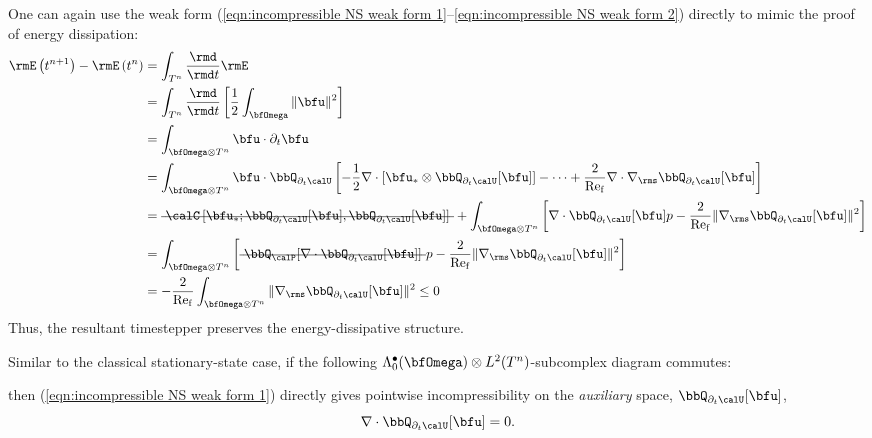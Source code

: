    One can again use the weak form (\ref{eqn:incompressible NS weak form 1}--\ref{eqn:incompressible NS weak form 2}) directly to mimic the proof of energy dissipation:
    \begin{align}
        \rmE\left(t^{n + 1}\right) - \rmE\left(t^{n}\right)
        &=  \int_{T^{n}}\frac{\rmd}{\rmd t}\rmE  \\
        &=  \int_{T^{n}}\frac{\rmd}{\rmd t}\left[\frac{1}{2}\int_{\bfOmega}\|\bfu\|^{2}\right]  \\
        &=  \int_{\bfOmega\otimes T^{n}}\bfu\cdot\partial_{t}\bfu  \\
        &=  \int_{\bfOmega\otimes T^{n}}\bfu\cdot\bbQ_{\partial_{t}\calU}\left[- \frac{1}{2}\nabla\cdot\left[\bfu_{*}\otimes\bbQ_{\partial_{t}\calU}[\bfu]\right] - \cdots + \frac{2}{\rmRef}\nabla\cdot\nabla_{\rms}\bbQ_{\partial_{t}\calU}[\bfu]\right]  \\
        &=  \mst{\calC\left[\bfu_{*}; \bbQ_{\partial_{t}\calU}[\bfu], \bbQ_{\partial_{t}\calU}[\bfu]\right]} + \int_{\bfOmega\otimes T^{n}}\left[\nabla\cdot\bbQ_{\partial_{t}\calU}[\bfu]p - \frac{2}{\rmRef}\|\nabla_{\rms}\bbQ_{\partial_{t}\calU}[\bfu]\|^{2}\right]  \\
        &=  \int_{\bfOmega\otimes T^{n}}\left[\mst{\bbQ_{\calP}[\nabla\cdot\bbQ_{\partial_{t}\calU}[\bfu]]}p - \frac{2}{\rmRef}\|\nabla_{\rms}\bbQ_{\partial_{t}\calU}[\bfu]\|^{2}\right]  \\
        &=  - \frac{2}{\rmRef}\int_{\bfOmega\otimes T^{n}}\|\nabla_{\rms}\bbQ_{\partial_{t}\calU}[\bfu]\|^{2}  \leq  0  \label{eqn:incompressible NS weak form dissipation}
    \end{align}
    Thus, the resultant timestepper preserves the energy-dissipative structure.

    \shortline

    Similar to the classical stationary-state case, if the following $\Lambda_{0}^{\bullet}(\bfOmega)\otimes L^{2}(T^{n})$-subcomplex diagram commutes:
    \begin{center}\end{center}
    then (\ref{eqn:incompressible NS weak form 1}) directly gives pointwise incompressibility on the \emph{auxiliary} space, $\bbQ_{\partial_{t}\calU}[\bfu]$,
    \begin{equation}
        \nabla\cdot\bbQ_{\partial_{t}\calU}[\bfu]  =  0.
    \end{equation}


